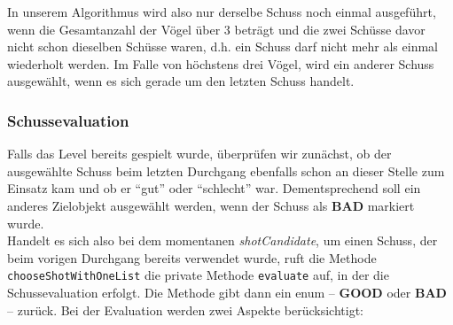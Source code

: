 In unserem Algorithmus wird also nur derselbe Schuss noch einmal ausgeführt, wenn die Gesamtanzahl der Vögel über 3 beträgt und die zwei Schüsse davor nicht schon dieselben Schüsse waren, d.h. ein Schuss darf nicht mehr als einmal wiederholt werden. Im Falle von höchstens drei Vögel, wird ein anderer Schuss ausgewählt, wenn es sich gerade um den letzten Schuss handelt.

\subsubsection{Schussevaluation}
Falls das Level bereits gespielt wurde, überprüfen wir zunächst, ob der ausgewählte Schuss beim letzten Durchgang ebenfalls schon an dieser Stelle zum Einsatz kam und ob er ``gut'' oder ``schlecht'' war. Dementsprechend soll ein anderes Zielobjekt ausgewählt werden, wenn der Schuss als \textbf{BAD} markiert wurde. \\
Handelt es sich also bei dem momentanen \textit{shotCandidate}, um einen Schuss, der beim vorigen Durchgang bereits verwendet wurde, ruft die Methode \texttt{chooseShotWithOneList} die private Methode \texttt{evaluate} auf, in der die Schussevaluation erfolgt. Die Methode gibt dann ein enum -- \textbf{GOOD} oder \textbf{BAD} -- zurück. Bei der Evaluation werden zwei Aspekte berücksichtigt:
